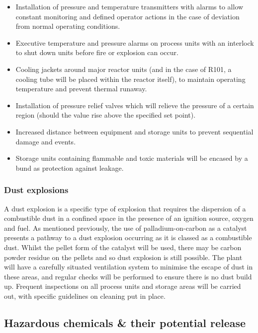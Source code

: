 \begin{itemize}
    \item Installation of pressure and temperature transmitters with alarms to allow constant monitoring and defined operator actions in the case of deviation from normal operating conditions.
    \item Executive temperature and pressure alarms on process units with an interlock to shut down units before fire or explosion can occur. 
    \item Cooling jackets around major reactor units (and in the case of R101, a cooling tube will be placed within the reactor itself), to maintain operating temperature and prevent thermal runaway.
    \item Installation of pressure relief valves which will relieve the pressure of a certain region (should the value rise above the specified set point).
    \item Increased distance between equipment and storage units to prevent sequential damage and events.
    \item Storage units containing flammable and toxic materials will be encased by a bund as protection against leakage.
\end{itemize}

\subsubsection{Dust explosions}

A dust explosion is a specific type of explosion that requires the dispersion of a combustible dust in a confined space in the presence of an ignition source, oxygen and fuel. As mentioned previously, the use of palladium-on-carbon as a catalyst presents a pathway to a dust explosion occurring as it is classed as a combustible dust. Whilst the pellet form of the catalyst will be used, there may be carbon powder residue on the pellets and so dust explosion is still possible. The plant will have a carefully situated ventilation system to minimise the escape of dust in these areas, and regular checks will be performed to ensure there is no dust build up.
Frequent inspections on all process units and storage areas will be carried out, with specific guidelines on cleaning put in place. 

\subsection{Hazardous chemicals \& their potential release}

